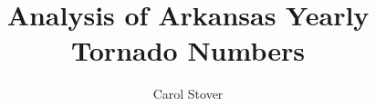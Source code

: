 \begin{center}
\title{\HUGE Analysis of Arkansas Yearly Tornado Numbers}
\author{\Large Carol Stover}
\maketitle


\end{center}

